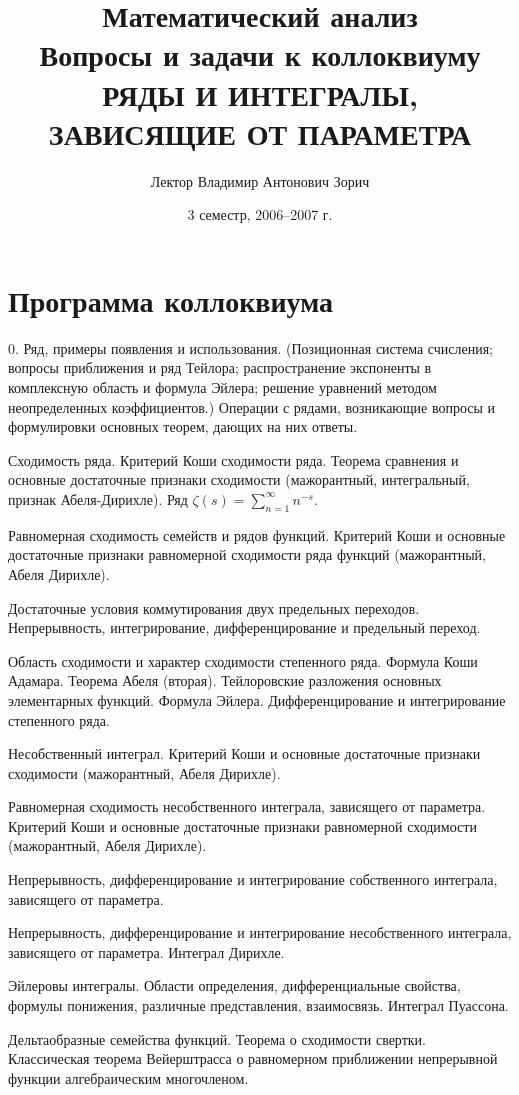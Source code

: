 \documentclass[a4paper]{article}
\title{Математический анализ\\
Вопросы и задачи к коллоквиуму\\
РЯДЫ И ИНТЕГРАЛЫ, ЗАВИСЯЩИЕ ОТ ПАРАМЕТРА}
\author{Лектор Владимир Антонович Зорич}
\date{3 семестр, 2006--2007 г.}
\begin{document}
\maketitle

\section*{Программа коллоквиума}

\begin{nums}{-2}
  \item[0.] Ряд, примеры появления и использования.
  (Позиционная система счисления; вопросы приближения
  и ряд Тейлора; распространение экспоненты в комплексную
  область и формула Эйлера; решение уравнений методом
  неопределенных коэффициентов.) Операции с рядами,
  возникающие вопросы и формулировки основных теорем,
  дающих на них ответы.
  \item Сходимость ряда. Критерий Коши сходимости ряда.
  Теорема сравнения и основные достаточные признаки
  сходимости (мажорантный, интегральный, признак
  Абеля-Дирихле). Ряд $\zeta(s)=\sum\limits_{n=1}^{\infty}n^{-s}$.
  \item Равномерная сходимость семейств и рядов функций. Критерий
  Коши и основные достаточные признаки равномерной сходимости ряда
  функций (мажорантный, Абеля Дирихле).
  \item Достаточные условия коммутирования двух предельных
  переходов. Непрерывность, интегрирование, дифференцирование и
  предельный переход.
  \item Область сходимости и характер сходимости степенного ряда.
  Формула Коши Адамара. Теорема Абеля (вторая). Тейлоровские
  разложения основных элементарных функций. Формула Эйлера.
  Дифференцирование и интегрирование степенного ряда.
  \item Несобственный интеграл. Критерий Коши и основные достаточные
  признаки сходимости (мажорантный, Абеля Дирихле).
  \item Равномерная сходимость несобственного интеграла, зависящего
  от параметра. Критерий Коши и основные достаточные признаки
  равномерной сходимости (мажорантный, Абеля Дирихле).
  \item Непрерывность, дифференцирование и интегрирование
  собственного интеграла, зависящего от параметра.
  \item Непрерывность, дифференцирование и интегрирование
  несобственного интеграла, зависящего от параметра. Интеграл
  Дирихле.
  \item Эйлеровы интегралы. Области определения, дифференциальные
  свойства, формулы понижения, различные представления, взаимосвязь.
  Интеграл Пуассона.
  \item Дельтаобразные семейства функций. Теорема о сходимости
  свертки. Классическая теорема Вейерштрасса о равномерном
  приближении непрерывной функции алгебраическим многочленом.
\end{nums}
\end{document}
